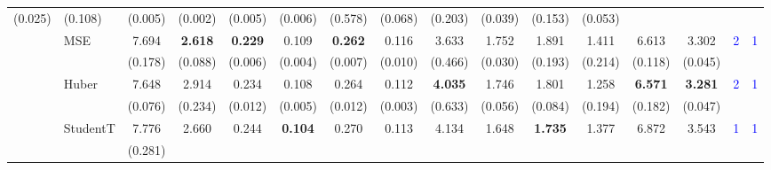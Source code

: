 \begin{table}[ht]
{\begin{tabular}{ll|cc|cc|cc|cc|cc|cc||cc}
                      \small{(0.025)} & 
                      \small{(0.108)} & 
                      \small{(0.005)} & 
                      \small{(0.002)} & 
                      \small{(0.005)} & 
                      \small{(0.006)} & 
                      \small{(0.578)} & 
                      \small{(0.068)} &
                      \small{(0.203)} & 
                      \small{(0.039)} &
                      \small{(0.153)} & 
                      \small{(0.053)} \\
\cline{2-16}
{} & \multirow{2}{*}{MSE} & 7.694 & \textbf{2.618} & \textbf{0.229} & 0.109 & \textbf{0.262} & 0.116 & 3.633 & 1.752 & 1.891 & 1.411 & 6.613 & 3.302 & \multirow{2}{*}{\small{\textcolor{blue}{2}}} & \multirow{2}{*}{\small{\textcolor{blue}{1}}} \\
                      {} & {} &
                      \small{(0.178)} & 
                      \small{(0.088)} & 
                      \small{(0.006)} & 
                      \small{(0.004)} & 
                      \small{(0.007)} & 
                      \small{(0.010)} & 
                      \small{(0.466)} & 
                      \small{(0.030)} &
                      \small{(0.193)} & 
                      \small{(0.214)} &
                      \small{(0.118)} & 
                      \small{(0.045)} \\
\cline{2-16}
{} & \multirow{2}{*}{Huber} & 7.648 & 2.914 & 0.234 & 0.108 & 0.264 & 0.112 & \textbf{4.035} & 1.746 & 1.801 & 1.258 & \textbf{6.571} & \textbf{3.281} & \multirow{2}{*}{\small{\textcolor{blue}{2}}} & \multirow{2}{*}{\small{\textcolor{blue}{1}}} \\
                      {} & {} &
                      \small{(0.076)} & 
                      \small{(0.234)} & 
                      \small{(0.012)} & 
                      \small{(0.005)} & 
                      \small{(0.012)} & 
                      \small{(0.003)} & 
                      \small{(0.633)} & 
                      \small{(0.056)} &
                      \small{(0.084)} & 
                      \small{(0.194)} &
                      \small{(0.182)} & 
                      \small{(0.047)} \\
\cline{2-16}
{} & \multirow{2}{*}{StudentT} & 7.776 & 2.660 & 0.244 & \textbf{0.104} & 0.270 & 0.113 & 4.134 & 1.648 & \textbf{1.735} & 1.377 & 6.872 & 3.543 & \multirow{2}{*}{\small{\textcolor{blue}{1}}} & \multirow{2}{*}{\small{\textcolor{blue}{1}}} \\
                      {} & {} &
                      \small{(0.281)} & 

\end{tabular}}
\end{table}
